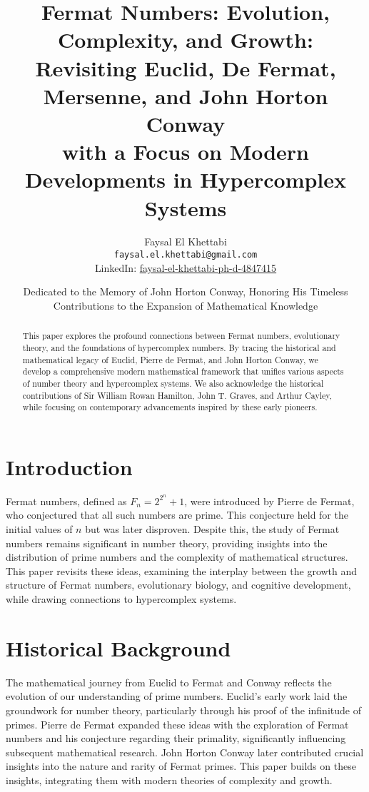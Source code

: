 \documentclass[12pt]{article}
\date{Dedicated to the Memory of John Horton Conway, Honoring His Timeless Contributions to the Expansion of Mathematical Knowledge}
\title{Fermat Numbers: Evolution, Complexity, and Growth:\\
Revisiting Euclid, De Fermat, Mersenne, and John Horton Conway \\
with a Focus on Modern Developments in Hypercomplex Systems}
\author{Faysal El Khettabi \\
\texttt{faysal.el.khettabi@gmail.com} \\
LinkedIn: \href{https://www.linkedin.com/in/faysal-el-khettabi-ph-d-4847415/}{faysal-el-khettabi-ph-d-4847415}
}
\begin{document}
\maketitle

\begin{abstract}
This paper explores the profound connections between Fermat numbers, evolutionary theory, and the foundations of hypercomplex numbers. By tracing the historical and mathematical legacy of Euclid, Pierre de Fermat, and John Horton Conway, we develop a comprehensive modern mathematical framework that unifies various aspects of number theory and hypercomplex systems. We also acknowledge the historical contributions of Sir William Rowan Hamilton, John T. Graves, and Arthur Cayley, while focusing on contemporary advancements inspired by these early pioneers.
\end{abstract}

\section{Introduction}

Fermat numbers, defined as \( F_n = 2^{2^n} + 1 \), were introduced by Pierre de Fermat, who conjectured that all such numbers are prime. This conjecture held for the initial values of \( n \) but was later disproven. Despite this, the study of Fermat numbers remains significant in number theory, providing insights into the distribution of prime numbers and the complexity of mathematical structures. This paper revisits these ideas, examining the interplay between the growth and structure of Fermat numbers, evolutionary biology, and cognitive development, while drawing connections to hypercomplex systems.

\section{Historical Background}

The mathematical journey from Euclid to Fermat and Conway reflects the evolution of our understanding of prime numbers. Euclid's early work laid the groundwork for number theory, particularly through his proof of the infinitude of primes. Pierre de Fermat expanded these ideas with the exploration of Fermat numbers and his conjecture regarding their primality, significantly influencing subsequent mathematical research. John Horton Conway later contributed crucial insights into the nature and rarity of Fermat primes. This paper builds on these insights, integrating them with modern theories of complexity and growth.
\end{document}
